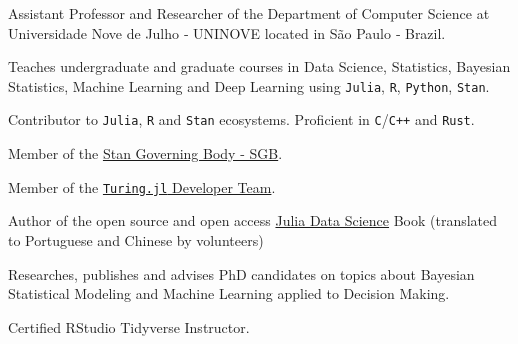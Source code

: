 \vspace{0.25cm}

\begin{cvitems}

	\item Assistant Professor and Researcher of the Department of Computer Science at Universidade Nove de Julho ‑
	UNINOVE located in São Paulo ‑ Brazil.
	\item Teaches undergraduate and graduate courses in Data Science, Statistics, Bayesian Statistics,
	Machine Learning and Deep Learning using \texttt{Julia}, \texttt{R}, \texttt{Python}, \texttt{Stan}.
	\item Contributor to \texttt{Julia}, \texttt{R} and \texttt{Stan} ecosystems. Proficient in \texttt{C}/\texttt{C++} and \texttt{Rust}.
	\item Member of the \href{https://mc-stan.org/about/}{Stan Governing Body - SGB}.
	\item Member of the \href{https://turing.ml/dev/team/}{\texttt{Turing.jl} Developer Team}.
	\item Author of the open source and open access \href{https://juliadatascience.io}{Julia Data Science} Book (translated to Portuguese and Chinese by volunteers)
	\item Researches, publishes and advises PhD candidates on topics about Bayesian Statistical Modeling and Machine
	Learning applied to Decision Making.
	\item Certified RStudio Tidyverse Instructor.

\end{cvitems}
